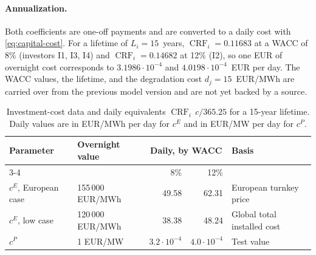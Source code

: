 \documentclass[11pt,a4paper,fleqn]{article}
\numberwithin{equation}{section}
\begin{document}
\paragraph{Annualization.}
Both coefficients are one-off payments and are converted to a daily cost with
\eqref{eq:capital-cost}. For a lifetime of $L_i=15$~years,
$\operatorname{CRF}_i=0.11683$ at a WACC of 8\% (investors I1, I3, I4) and
$\operatorname{CRF}_i=0.14682$ at 12\% (I2), so one EUR of overnight cost
corresponds to $3.1986\cdot10^{-4}$ and $4.0198\cdot10^{-4}$~EUR per day. The
WACC values, the lifetime, and the degradation cost $d_j=15$~EUR/MWh are
carried over from the previous model version and are not yet backed by a
source.

\begin{table}[H]
\centering
\caption{Investment-cost data and daily equivalents
$\operatorname{CRF}_i\,c/365.25$ for a 15-year lifetime. Daily values are in
EUR/MWh per day for $c^E$ and in EUR/MW per day for $c^P$.}
\label{tab:cost-data}
\begin{tabular}{@{}llrrl@{}}
\toprule
Parameter & Overnight value & \multicolumn{2}{c}{Daily, by WACC} & Basis \\
\cmidrule(lr){3-4}
 & & 8\% & 12\% & \\
\midrule
$c^E$, European case & 155\,000 EUR/MWh & 49.58 & 62.31 & European turnkey price \\
$c^E$, low case      & 120\,000 EUR/MWh & 38.38 & 48.24 & Global total installed cost \\
$c^P$                & 1 EUR/MW & $3.2\cdot10^{-4}$ & $4.0\cdot10^{-4}$ & Test value \\
\bottomrule
\end{tabular}
\end{table}

\printbibliography
\end{document}
